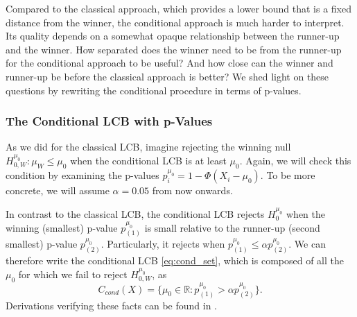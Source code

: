 \documentclass{article}
\newcommand{\R}{\mathbb{R}}
\begin{document}
Compared to the classical approach, which provides a lower bound that is a fixed distance from the winner, the conditional approach is much harder to interpret. Its quality depends on a somewhat opaque relationship between the runner-up and the winner. How separated does the winner need to be from the runner-up for the conditional approach to be useful? And how close can the winner and runner-up be before the classical approach is better? We shed light on these questions by rewriting the conditional procedure in terms of p-values. 

\subsubsection{The Conditional LCB with p-Values}

As we did for the classical LCB, imagine rejecting the winning null $H^{\mu_0}_{0, W}: \mu_{W} \leq \mu_0$ when the conditional LCB is at least $\mu_0$. Again, we will check this condition by examining the p-values $p^{\mu_0}_i = 1- \Phi(X_i - \mu_0)$. To be more concrete, we will assume $\alpha=0.05$ from now onwards. 

In contrast to the classical LCB, the conditional LCB rejects $H^{\mu_0}_0$ when the winning (smallest) p-value $p^{\mu_0}_{(1)}$ is small relative to the runner-up (second smallest) p-value $p^{\mu_0}_{(2)}$. Particularly, it rejects when $p^{\mu_0}_{(1)} \leq \alpha p^{\mu_0}_{(2)}$. We can therefore write the conditional LCB \eqref{eq:cond_set}, which is composed of all the $\mu_0$ for which we fail to reject $H_{0, W}^{\mu_0}$, as  
\begin{equation}
\label{eq:cond_set_p_val}
    C_{cond}(X) = \{ \mu_0 \in \R:  p^{\mu_0}_{(1)} >  \alpha p^{\mu_0}_{(2)} \}. 
\end{equation}
Derivations verifying these facts can be found in . 
\end{document}
